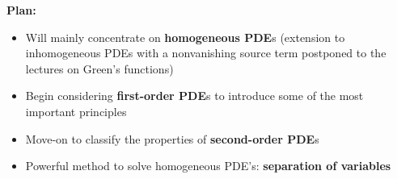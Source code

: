 \documentclass{article}
\begin{document}
\vspace{2mm} \noindent
\textbf{Plan:}

\begin{itemize}
    \item Will mainly concentrate on \textbf{homogeneous PDE}s (extension to inhomogeneous PDEs with a nonvanishing source term postponed to the lectures on Green’s functions)
    \item Begin considering \textbf{first-order PDE}s to introduce some of the most important principles
    \item Move-on to classify the properties of \textbf{second-order PDE}s
    \item Powerful method to solve homogeneous PDE’s: \textbf{separation of variables}
\end{itemize}
\end{document}

